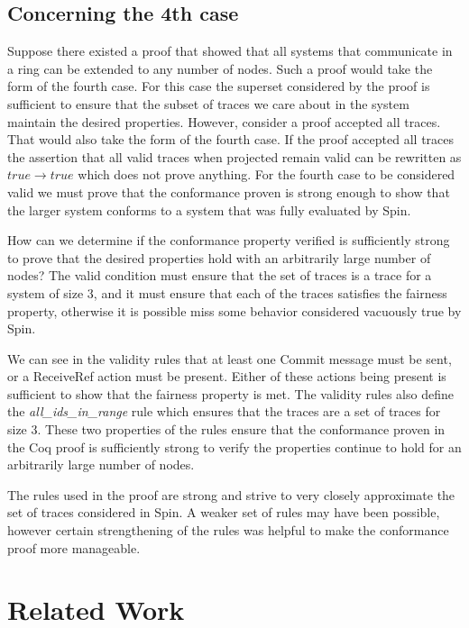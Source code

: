 \documentclass[runningheads]{llncs}
\begin{document}
\subsection{Concerning the 4th case}
Suppose there existed a proof that showed that all systems that communicate in a ring can be extended to any number of nodes. Such a proof would take the form of the fourth case. For this case the superset considered by the proof is sufficient to ensure that the subset of traces we care about in the system maintain the desired properties. However, consider a proof accepted all traces. That would also take the form of the fourth case. If the proof accepted all traces the assertion that all valid traces when projected remain valid can be rewritten as $true \longrightarrow true$ which does not prove anything. For the fourth case to be considered valid we must prove that the conformance proven is strong enough to show that the larger system conforms to a system that was fully evaluated by Spin. 

How can we determine if the conformance property verified is sufficiently strong to prove that the desired properties hold with an arbitrarily large number of nodes? The valid condition must ensure that the set of traces is a trace for a system of size 3, and it must ensure that each of the traces satisfies the fairness property, otherwise it is possible miss some behavior considered vacuously true by Spin. 

We can see in the validity rules that at least one Commit message must be sent, or a ReceiveRef action must be present. Either of these actions being present is sufficient to show that the fairness property is met. The validity rules also define the \emph{all\_ids\_in\_range} rule which ensures that the traces are a set of traces for size 3. These two properties of the rules ensure that the conformance proven in the Coq proof is sufficiently strong to verify the properties continue to hold for an arbitrarily large number of nodes. 

The rules used in the proof are strong and strive to very closely approximate the set of traces considered in Spin.  
A weaker set of rules may have been possible, however certain strengthening of the rules was helpful to make the conformance proof more manageable. 


\section{Related Work}
 
\end{document}
